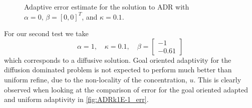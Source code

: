\begin{test}[Pure Diffusion, i.e. Heat Equation, $\kappa = 0.1$]
    \begin{figure}[h]
        \centering
        \caption{Adaptive error estimate for the solution to ADR with
             $\alpha = 0,\, \beta = [0, 0]^T$, and $\kappa=0.1$.}
        \label{fig:Heatk1E-1_err}
    \end{figure}

\end{test}

\begin{test}[Diffusion Dominated ADR, $\kappa = 0.1$] \label{tst:ADRk1E-1}
    For our second test we take
    \begin{equation*}
        \alpha = 1, \quad
        \kappa = 0.1, \quad
        \beta = \begin{bmatrix} -1 \\ -0.61 \end{bmatrix}
    \end{equation*}
    which corresponds to a diffusive solution. Goal oriented adaptivity for
    the diffusion dominated problem is not expected to perform much better than
    uniform refine, due to the non-locality of the concentration, $u$. This is
    clearly observed when looking at the comparison of error for the goal
    oriented adapted and uniform adaptivity in \autoref{fig:ADRk1E-1_err}.
    \begin{figure}[h]
        \centering
        \begin{minipage}[t]{0.49\textwidth}
            \centering
\end{minipage}
\end{figure}
\end{test}

